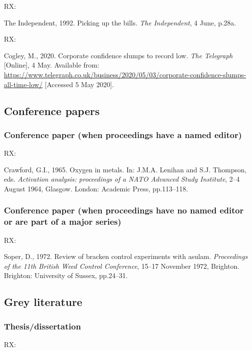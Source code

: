 RX: \cite{independent1992pub}

The Independent, 1992. Picking up the bills. \emph{The Independent}, 4 June, p.28a.


RX: \cite{cogley2020ccs}

Cogley, M., 2020. Corporate confidence slumps to record low. \emph{The Telegraph} [Online], 4 May. Available from: \url{https://www.telegraph.co.uk/business/2020/05/03/corporate-confidence-slumps-all-time-low/} [Accessed 5 May 2020].



\subsection{Conference papers}

\subsubsection*{Conference paper (when proceedings have a named editor)}

RX: \cite{crawford1965oim}

Crawford, G.I., 1965. Oxygen in metals. In: J.M.A. Lenihan and S.J. Thompson, eds. \emph{Activation analysis: proceedings of a NATO Advanced Study Institute}, 2--4 August 1964, Glasgow. London: Academic Press, pp.113--118.



\subsubsection*{Conference paper (when proceedings have no named editor or are part of a major series)}

RX: \cite{soper1972rbc}

Soper, D., 1972. Review of bracken control experiments with asulam. \emph{Proceedings of the 11th British Weed Control Conference}, 15--17 November 1972, Brighton. Brighton: University of Sussex, pp.24--31.



\subsection{Grey literature}

\subsubsection*{Thesis/dissertation}

RX: \cite{burrell1973ist}

